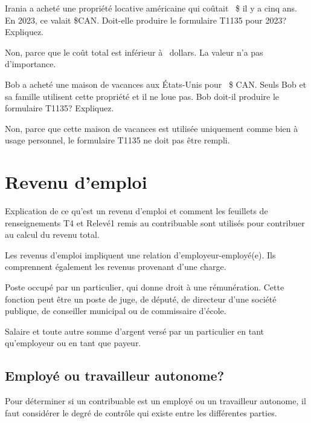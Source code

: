 \begin{question}
	Irania a acheté une propriété locative américaine qui coûtait ~\$ il y a cinq ans. En 2023, ce valait \$CAN. Doit-elle produire le formulaire T1135 pour 2023? Expliquez.
\end{question}
Non, parce que le coût total est inférieur à ~dollars. La valeur n'a pas d'importance.

\begin{question}
	Bob a acheté une maison de vacances aux États-Unis pour ~\$ CAN. Seuls Bob et sa famille utilisent cette propriété et il ne loue pas. Bob doit-il produire le formulaire T1135? Expliquez.
\end{question}
Non, parce que cette maison de vacances est utilisée uniquement comme bien à usage personnel, le formulaire T1135 ne doit pas être rempli.



\section{Revenu d'emploi}
\begin{intro}
	Explication de ce qu'est un revenu d'emploi et comment les feuillets de renseignements T4 et Relevé1 remis au contribuable sont utilisés pour contribuer au calcul du revenu total.
\end{intro}
Les revenus d'emploi impliquent une relation d'employeur-employé(e). Ils comprennent également les revenus provenant d'une charge.

\begin{description}
	\item[Charge] Poste occupé par un particulier, qui donne droit à une rémunération. Cette fonction peut être un poste de juge, de député, de directeur d'une société publique, de conseiller municipal ou de commissaire d'école.
	\item[Rémunération] Salaire et toute autre somme d'argent versé par un particulier en tant qu'employeur ou en tant que payeur.
\end{description}


\subsection{Employé ou travailleur autonome?}
Pour déterminer si un contribuable est un employé ou un travailleur autonome, il faut considérer le degré de contrôle qui existe entre les différentes parties.

